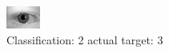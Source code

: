 \begin{figure}[h!]
\begin{center}
\includegraphics[width=0.60\columnwidth]{figures/ID636_class_2_target_3.png}
\end{center}
\caption{ Classification: 2 actual target: 3}
\label{fig:ID636_class_2_target_3}
\end{figure}
